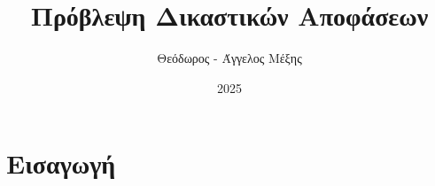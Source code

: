 \documentclass{ntua-thesis}
\title{Πρόβλεψη Δικαστικών Αποφάσεων }
\author{Θεόδωρος - Άγγελος Μέξης}
\date{2025}
\begin{document}
\maketitle

\section{Εισαγωγή}
\end{document}
